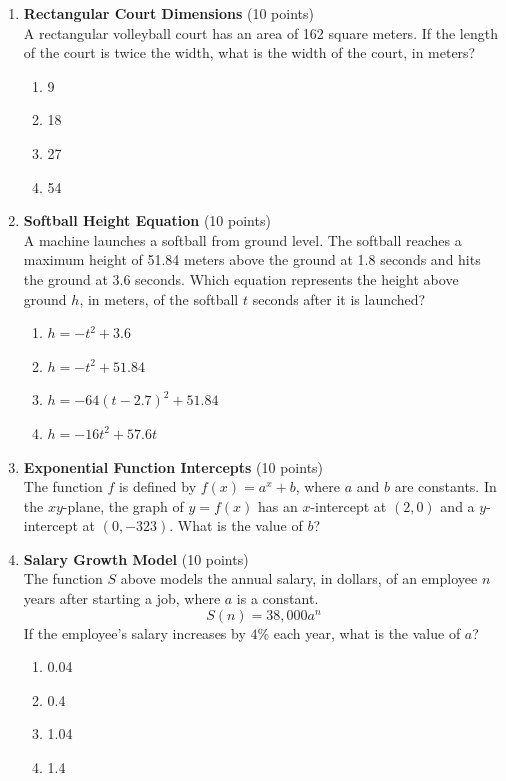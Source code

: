 \begin{enumerate}
  \newpage

  \item \textbf{Rectangular Court Dimensions} (10 points)\\
  A rectangular volleyball court has an area of 162 square meters. If the length of the court is twice the width, what is the width of the court, in meters?
  \begin{enumerate}[label=(\Alph*)]
    \item 9
    \item 18
    \item 27
    \item 54
  \end{enumerate}
  \begin{subanswer}
  \end{subanswer}

  \item \textbf{Softball Height Equation} (10 points)\\
  A machine launches a softball from ground level. The softball reaches a maximum height of 51.84 meters above the ground at 1.8 seconds and hits the ground at 3.6 seconds. Which equation represents the height above ground $h$, in meters, of the softball $t$ seconds after it is launched?
  \begin{enumerate}[label=(\Alph*)]
    \item $h=-t^{2}+3.6$
    \item $h=-t^{2}+51.84$
    \item $h=-64(t-2.7)^{2}+51.84$
    \item $h=-16t^{2}+57.6t$
  \end{enumerate}
  \begin{subanswer}
  \end{subanswer}

  \item \textbf{Exponential Function Intercepts} (10 points)\\
  The function $f$ is defined by $f(x)=a^{x}+b$, where $a$ and $b$ are constants. In the $xy$-plane, the graph of $y=f(x)$ has an $x$-intercept at $(2,0)$ and a $y$-intercept at $(0,-323)$. What is the value of $b$?
  \begin{subanswer}
  \end{subanswer}

  \item \textbf{Salary Growth Model} (10 points)\\
  The function $S$ above models the annual salary, in dollars, of an employee $n$ years after starting a job, where $a$ is a constant.
  \[
  S(n)=38,000 a^{n}
  \]
  If the employee's salary increases by $4\%$ each year, what is the value of $a$?
  \begin{enumerate}[label=(\Alph*)]
    \item 0.04
    \item 0.4
    \item 1.04
    \item 1.4
  \end{enumerate}
  \begin{subanswer}
  \end{subanswer}


\end{enumerate}
